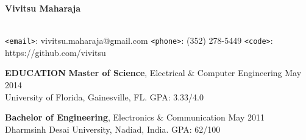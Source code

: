 \documentclass[10pt, a4paper]{article}
\begin{document}
\begin{center}
\textbf{\Large Vivitsu Maharaja}
\date{}
\thispagestyle{empty}
\smallskip \\
\texttt{<email>}: vivitsu.maharaja@gmail.com \texttt{<phone>}: (352) 278-5449 \texttt{<code>}: https://github.com/vivitsu
\end{center}

\textbf{EDUCATION}
\smallskip
\newline
{\bf Master of Science}, Electrical \& Computer Engineering \hfill May 2014\\
University of Florida, Gainesville, FL. \hfill GPA: 3.33/4.0

{\bf Bachelor of Engineering}, Electronics \& Communication \hfill May 2011\\
Dharmsinh Desai University, Nadiad, India. \hfill GPA: 62/100
\end{document}
